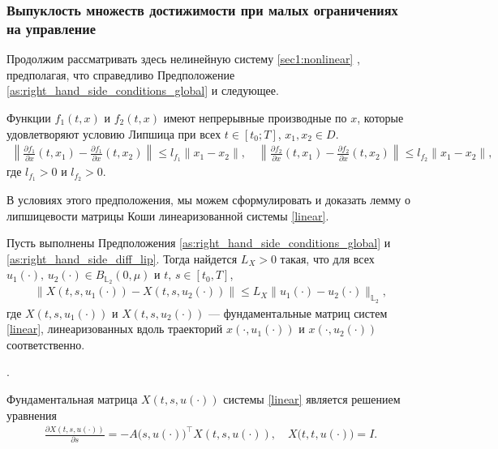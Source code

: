 \documentclass[../main.tex]{subfiles}
\begin{document}
	\subsubsection{Выпуклость множеств достижимости при малых ограничениях на управление}
	
	Продолжим рассматривать здесь нелинейную систему \eqref{sec1:nonlinear} , предполагая, что справедливо Предположение \ref{as:right_hand_side_conditions_global} и следующее.
	 \begin{assumption}\label{as:right_hand_side_diff_lip}
		Функции $f_1(t,x)$ и $f_2(t,x)$ имеют непрерывные производные по $x$, которые удовлетворяют условию Липшица при всех $t \in [t_0;T]$, $x_1, x_2 \in D$.
		\begin{gather*}
			\left\| \frac{\partial f_1}{\partial x}(t,x_1) - \frac{\partial f_1}{\partial x}(t,x_2) \right\| \leqslant l_{f_1} \| x_1 - x_2\|, \quad 	\left\| \frac{\partial f_2}{\partial x}(t,x_1) - \frac{\partial f_2}{\partial x}(t,x_2) \right\| \leqslant l_{f_2} \| x_1 - x_2\|,
		\end{gather*}
		где $l_{f_1} > 0$ и $l_{f_2} > 0$.
	\end{assumption}
	
	В условиях этого предположения, мы можем сформулировать и доказать лемму о липшицевости матрицы Коши линеаризованной системы \eqref{linear}.
	\begin{lemma}\label{lem: Lip_fundumental_matrix}
		Пусть выполнены Предположения \ref{as:right_hand_side_conditions_global} и \ref{as:right_hand_side_diff_lip}.  Тогда найдется $L_X > 0 $ такая, что для всех $u_1(\cdot),\, u_2(\cdot) \in B_{\mathbb{L}_2}(0,\mu)$ и $t, \, s  \in [t_0,T]$, 
		\begin{gather*}
			\Big\|X(t,s,u_1(\cdot)) - X(t,s,u_2(\cdot)) \Big\| \leqslant L_X \| u_1(\cdot) - u_2(\cdot) \|_{\mathbb{L}_2},
		\end{gather*}
	где $X(t,s,u_1(\cdot)) $ и $X(t,s,u_2(\cdot)) $ --- фундаментальные матриц систем \eqref{linear}, линеаризованных вдоль траекторий $x(\cdot, u_1(\cdot)) $ и $x(\cdot, u_2(\cdot)) $ соответственно. 
	\end{lemma}
		\doc.
		
		 Фундаментальная матрица $X(t,s,u(\cdot)) $  системы \eqref{linear} является решением уравнения
		\begin{gather*}
			\frac{\partial X(t, s, u(\cdot))}{\partial s} = -A\big(s,u(\cdot)\big)^{\top} X(t, s, u(\cdot)), \quad X\big(t, t, u(\cdot)\big) = I.
		\end{gather*}
		
\end{document}

